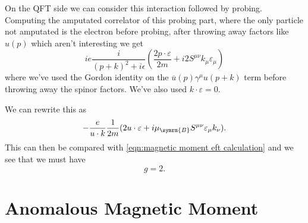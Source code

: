 \documentclass[fleqn]{NotesClass}
\newcommand{\diracadjoint}[1]{\overbar{#1}}
\newcommand{\bohrMagneton}{\mu_{\symrm{B}}}
\begin{document}
    On the QFT side we can consider this interaction followed by probing.
    Computing the amputated correlator of this probing part, where the only particle not amputated is the electron before probing, after throwing away factors like \(u(p)\) which aren't interesting we get
    \begin{equation}
        ie \frac{i}{(p + k)^2 + i\epsilon} \left( \frac{2p \cdot \varepsilon}{2m} + i2S^{\mu\nu}k_\mu \varepsilon_\mu \right)
    \end{equation}
    where we've used the Gordon identity on the \(\diracadjoint{u}(p) \gamma^\mu u(p + k)\) term before throwing away the spinor factors.
    We've also used \(k \cdot \varepsilon = 0\).
    
    We can rewrite this as
    \begin{equation}
        - \frac{e}{u \cdot k} \frac{1}{2m}(2u \cdot \varepsilon + i\bohrMagneton S^{\mu\nu}\varepsilon_\mu k_\nu).
    \end{equation}
    This can then be compared with \cref{eqn:magnetic moment eft calculation} and we see that we must have
    \begin{equation}
        g = 2.
    \end{equation}	
    
    \chapter{Anomalous Magnetic Moment}
\end{document}
